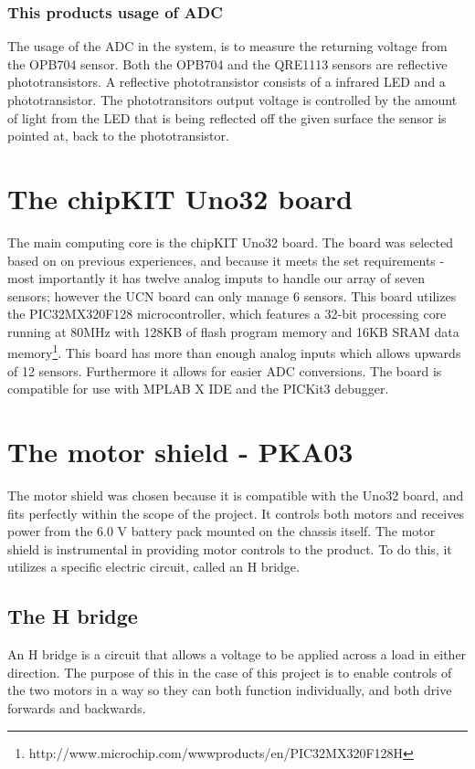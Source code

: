 \subsubsection{This products usage of ADC}
The usage of the ADC in the system, is to measure the returning voltage from the OPB704 sensor. Both the OPB704 and the QRE1113 sensors are reflective phototransistors.
A reflective phototransistor consists of a infrared LED and a phototransistor.
The phototransitors output voltage is controlled by the amount of light from the LED that is being reflected off the given surface the sensor is pointed at, back to the phototransistor.

\section{The chipKIT Uno32 board}
The main computing core is the chipKIT Uno32 board. The board was selected based on on previous experiences, and because it meets the set requirements - most importantly it has twelve analog imputs to handle our array of seven sensors; however the UCN board can only manage 6 sensors. This board utilizes the PIC32MX320F128 microcontroller, which features a 32-bit processing core running at 80MHz with 128KB of flash program memory and 16KB SRAM data memory\footnote{http://www.microchip.com/wwwproducts/en/PIC32MX320F128H}. 
This board has more than enough analog inputs which allows upwards of 12 sensors. Furthermore it allows for easier ADC conversions.
The board is compatible for use with MPLAB X IDE and the PICKit3 debugger.

\section{The motor shield - PKA03}
The motor shield was chosen because it is compatible with the Uno32 board, and fits perfectly within the scope of the project. It controls both motors and receives power from the 6.0 V battery pack mounted on the chassis itself. The motor shield is instrumental in providing motor controls to the product. To do this, it utilizes a specific electric circuit, called an H bridge.
\newpage
\subsection{The H bridge}
An H bridge is a circuit that allows a voltage to be applied across a load in either direction. The purpose of this in the case of this project is to enable controls of the two motors in a way so they can both function individually, and both drive forwards and backwards.\\

